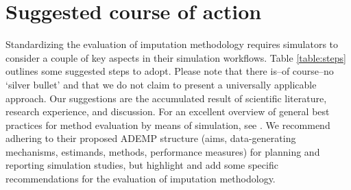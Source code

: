 \documentclass[bimj,fleqn]{w-art}
\begin{document}




\section{Suggested course of action}

Standardizing the evaluation of imputation methodology requires simulators to consider a couple of key aspects in their simulation workflows. Table \ref{table:steps} outlines some suggested steps to adopt. Please note that there is--of course--no `silver bullet' and that we do not claim to present a universally applicable approach. Our suggestions are the accumulated result of scientific literature, research experience, and discussion. For an excellent overview of general best practices for method evaluation by means of simulation, see \citet{morr18}. We recommend adhering to their proposed ADEMP structure (aims, data-generating mechanisms, estimands, methods, performance measures) for planning and reporting simulation studies, but highlight and add some specific recommendations for the evaluation of imputation methodology.
\end{document}
